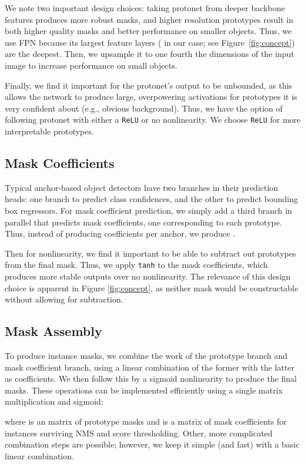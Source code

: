 \documentclass[10pt,journal,compsoc]{IEEEtran}
\begin{document}
We note two important design choices: taking protonet from deeper backbone features produces more robust masks, and higher resolution prototypes result in both higher quality masks and better performance on smaller objects. Thus, we use FPN \cite{fpn} because its largest feature layers ( in our case; see Figure~\ref{fig:concept}) are the deepest. Then, we upsample it to one fourth the dimensions of the input image to increase performance on small objects.

    
Finally, we find it important for the protonet's output to be unbounded, as this allows the network to produce large, overpowering activations for prototypes it is very confident about (e.g., obvious background). Thus, we have the option of following protonet with either a {\tt ReLU} or no nonlinearity. We choose {\tt ReLU} for more interpretable prototypes.

\subsection{Mask Coefficients}
Typical anchor-based object detectors have two branches in their prediction heads: one branch to predict  class confidences, and the other to predict  bounding box regressors. For mask coefficient prediction, we simply add a third branch in parallel that predicts  mask coefficients, one corresponding to each prototype. Thus, instead of producing  coefficients per anchor, we produce .

Then for nonlinearity, we find it important to be able to subtract out prototypes from the final mask. Thus, we apply {\tt tanh} to the  mask coefficients, which produces more stable outputs over no nonlinearity. The relevance of this design choice is apparent in Figure \ref{fig:concept}, as neither mask would be constructable without allowing for subtraction.


\subsection{Mask Assembly}
To produce instance masks, we combine the work of the prototype branch and mask coefficient branch, using a linear combination of the former with the latter as coefficients. We then follow this by a sigmoid nonlinearity to produce the final masks. These operations can be implemented efficiently using a single matrix multiplication and sigmoid:
    
where  is an  matrix of prototype masks and  is a  matrix of mask coefficients for  instances surviving NMS and score thresholding. Other, more complicated combination steps are possible; however, we keep it simple (and fast) with a basic linear combination.
\end{document}
